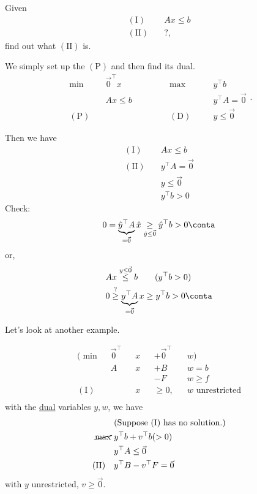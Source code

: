 \begin{eg}
	Given
	\[
		\begin{aligned}
			(\mathrm{I})\quad  & Ax\leq b \\
			(\mathrm{II})\quad & ?,
		\end{aligned}
	\]
	find out what \((\mathrm{II})\) is.
\end{eg}
\begin{explanation}
	We simply set up the \((\mathrm{P})\) and then find its dual.
	\[
		\begin{alignedat}{5}
			\min~&\vec{0}^{\top} x\qquad\qquad	&&\max ~&&y^{\top}b\\
			&Ax \leq b 			&&			&&y^{\top} A =\vec{0}\\
			(\mathrm{P})\quad&			&&(\mathrm{D})\quad	&&y\leq \vec{0}
		\end{alignedat}.
	\]

	Then we have
	\[
		\begin{aligned}
			(\mathrm{I})\quad  & Ax\leq b            \\
			(\mathrm{II})\quad & y^{\top}A = \vec{0} \\
			                   & y\leq \vec{0}       \\
			                   & y^{\top} b>0
		\end{aligned}
	\]
	Check\(\colon\)
	\[
		0 = \underbrace{\hat{y}^{\top} A}_{=\vec{0}} \hat{x} \underset{\hat{y} \leq \vec{0}}{\geq}  \hat{y}^{\top} b>0 \conta
	\]
	or,
	\[
		\begin{split}
			&Ax \overset{y\leq \vec{0}}{\leq} b\qquad (y^{\top}b>0)\\
			&0 \overset{?}{\geq} \underbrace{y^{\top}A}_{ = \vec{0}} x\geq y^{\top}b>0\conta
		\end{split}
	\]
\end{explanation}

Let's look at another example.

\begin{eg}
	\[
		\begin{alignedat}{4}
			(\min~   & \vec{0}^{\top} &&x &&+ \vec{0}^{\top} &&w)            \\
			& A&&x &&+ B&&w = b    \\
			& && &&-F&&w \geq f \\
			(\mathrm{I})\quad & &&x&&\geq  0, &&w\text{ unrestricted}          \\
		\end{alignedat}
	\]
	with the \hyperref[def:dual]{dual} variables \(y, w\), we have
	\[
		\begin{aligned}
			                   & (\text{Suppose \((\mathrm{I})\) has no solution.}) \\
			\cancel{\max}~     & y^{\top} b + v^{\top} b (>0)                       \\
			                   & y^{\top} A \leq \vec{0}                            \\
			(\mathrm{II})\quad & y^{\top} B - v^{\top} F = \vec{0}
		\end{aligned}
	\]
	with \(y\) unrestricted, \(v\geq  \vec{0}\).
\end{eg}

